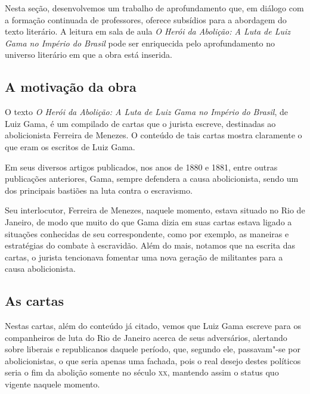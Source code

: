 \documentclass[12pt]{extarticle}
\begin{document}
Nesta seção, desenvolvemos um trabalho de aprofundamento que, em diálogo
com a formação continuada de professores, oferece subsídios para a
abordagem do texto literário. A leitura em sala de aula \emph{O Herói da
Abolição: A Luta de Luiz Gama no Império do Brasil} pode ser enriquecida
pelo aprofundamento no universo literário em que a obra está inserida.




\subsection{A motivação da obra}

O texto \emph{O Herói da Abolição: A Luta de Luiz Gama no Império do
Brasil}, de Luiz Gama, é um compilado de cartas que o jurista escreve,
destinadas ao abolicionista Ferreira de Menezes. O conteúdo de tais
cartas mostra claramente o que eram os escritos de Luiz Gama.

Em seus diversos artigos publicados, nos anos de 1880 e 1881, entre
outras publicações anteriores, Gama, sempre defendera a causa
abolicionista, sendo um dos principais bastiões na luta contra o
escravismo.

Seu interlocutor, Ferreira de Menezes, naquele momento, estava situado
no Rio de Janeiro, de modo que muito do que Gama dizia em suas cartas
estava ligado a situações conhecidas de seu correspondente, como por
exemplo, as maneiras e estratégias do combate à escravidão. Além do
mais, notamos que na escrita das cartas, o jurista tencionava fomentar
uma nova geração de militantes para a causa abolicionista.

\subsection{As cartas}

Nestas cartas, além do conteúdo já citado, vemos que Luiz Gama escreve
para os companheiros de luta do Rio de Janeiro acerca de seus
adversários, alertando sobre liberais e republicanos daquele período,
que, segundo ele, passavam"-se por abolicionistas, o que seria apenas uma
fachada, pois o real desejo destes políticos seria o fim da abolição
somente no século \textsc{xx}, mantendo assim o status quo vigente naquele
momento.


\end{document}
